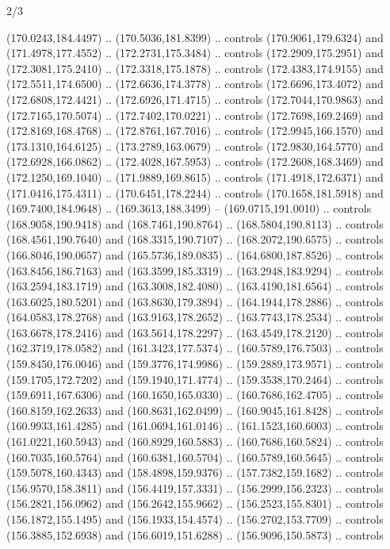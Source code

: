 \begin{flagdescription}{2/3}
\begin{scope}[shift={(0.5\flaglength,0.5)},scale=\flagwidth/320]
\begin{scope}[y=0.8pt, x=0.8pt, yscale=-1,shift={(-118.3,-146)}]
  (170.0243,184.4497) .. (170.5036,181.8399) .. controls (170.9061,179.6324) and
  (171.4978,177.4552) .. (172.2731,175.3484) .. controls (172.2909,175.2951) and
  (172.3081,175.2410) .. (172.3318,175.1878) .. controls (172.4383,174.9155) and
  (172.5511,174.6500) .. (172.6636,174.3778) .. controls (172.6696,173.4072) and
  (172.6808,172.4421) .. (172.6926,171.4715) .. controls (172.7044,170.9863) and
  (172.7165,170.5074) .. (172.7402,170.0221) .. controls (172.7698,169.2469) and
  (172.8169,168.4768) .. (172.8761,167.7016) .. controls (172.9945,166.1570) and
  (173.1310,164.6125) .. (173.2789,163.0679) .. controls (172.9830,164.5770) and
  (172.6928,166.0862) .. (172.4028,167.5953) .. controls (172.2608,168.3469) and
  (172.1250,169.1040) .. (171.9889,169.8615) .. controls (171.4918,172.6371) and
  (171.0416,175.4311) .. (170.6451,178.2244) .. controls (170.1658,181.5918) and
  (169.7400,184.9648) .. (169.3613,188.3499) -- (169.0715,191.0010) .. controls
  (168.9058,190.9418) and (168.7461,190.8764) .. (168.5804,190.8113) .. controls
  (168.4561,190.7640) and (168.3315,190.7107) .. (168.2072,190.6575) .. controls
  (166.8046,190.0657) and (165.5736,189.0835) .. (164.6800,187.8526) .. controls
  (163.8456,186.7163) and (163.3599,185.3319) .. (163.2948,183.9294) .. controls
  (163.2594,183.1719) and (163.3008,182.4080) .. (163.4190,181.6564) .. controls
  (163.6025,180.5201) and (163.8630,179.3894) .. (164.1944,178.2886) .. controls
  (164.0583,178.2768) and (163.9163,178.2652) .. (163.7743,178.2534) .. controls
  (163.6678,178.2416) and (163.5614,178.2297) .. (163.4549,178.2120) .. controls
  (162.3719,178.0582) and (161.3423,177.5374) .. (160.5789,176.7503) .. controls
  (159.8450,176.0046) and (159.3776,174.9986) .. (159.2889,173.9571) .. controls
  (159.1705,172.7202) and (159.1940,171.4774) .. (159.3538,170.2464) .. controls
  (159.6911,167.6306) and (160.1650,165.0330) .. (160.7686,162.4705) .. controls
  (160.8159,162.2633) and (160.8631,162.0499) .. (160.9045,161.8428) .. controls
  (160.9933,161.4285) and (161.0694,161.0146) .. (161.1523,160.6003) .. controls
  (161.0221,160.5943) and (160.8929,160.5883) .. (160.7686,160.5824) .. controls
  (160.7035,160.5764) and (160.6381,160.5704) .. (160.5789,160.5645) .. controls
  (159.5078,160.4343) and (158.4898,159.9376) .. (157.7382,159.1682) .. controls
  (156.9570,158.3811) and (156.4419,157.3331) .. (156.2999,156.2323) .. controls
  (156.2821,156.0962) and (156.2642,155.9662) .. (156.2523,155.8301) .. controls
  (156.1872,155.1495) and (156.1933,154.4574) .. (156.2702,153.7709) .. controls
  (156.3885,152.6938) and (156.6019,151.6288) .. (156.9096,150.5873) .. controls

\end{scope}
\end{scope}
\end{flagdescription}
